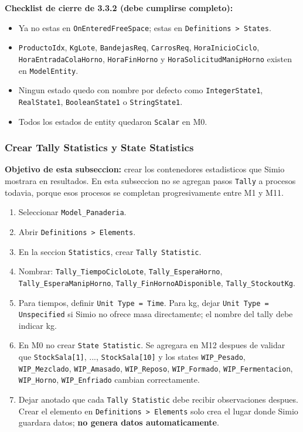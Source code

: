 \documentclass[11pt]{article}
\newcommand{\simio}[1]{\texttt{#1}}
\newcommand{\state}[1]{\texttt{#1}}
\begin{document}
\textbf{Checklist de cierre de 3.3.2 (debe cumplirse completo):}
\begin{itemize}
  \item [ ] Ya no estas en \simio{OnEnteredFreeSpace}; estas en \simio{Definitions > States}.
  \item [ ] \state{ProductoIdx}, \state{KgLote}, \state{BandejasReq}, \state{CarrosReq}, \state{HoraInicioCiclo}, \state{HoraEntradaColaHorno}, \state{HoraFinHorno} y \state{HoraSolicitudManipHorno} existen en \simio{ModelEntity}.
  \item [ ] Ningun estado quedo con nombre por defecto como \simio{IntegerState1}, \simio{RealState1}, \simio{BooleanState1} o \simio{StringState1}.
  \item [ ] Todos los estados de entity quedaron \simio{Scalar} en M0.
\end{itemize}

\subsubsection{Crear Tally Statistics y State Statistics}
\textbf{Objetivo de esta subseccion:} crear los contenedores estadisticos que Simio mostrara en resultados. En esta subseccion no se agregan pasos \simio{Tally} a procesos todavia, porque esos procesos se completan progresivamente entre M1 y M11.

\begin{enumerate}
  \item Seleccionar \simio{Model\_Panaderia}.
  \item Abrir \simio{Definitions > Elements}.
  \item En la seccion \simio{Statistics}, crear \simio{Tally Statistic}.
  \item Nombrar: \simio{Tally\_TiempoCicloLote}, \simio{Tally\_EsperaHorno}, \simio{Tally\_EsperaManipHorno}, \simio{Tally\_FinHornoADisponible}, \simio{Tally\_StockoutKg}.
  \item Para tiempos, definir \simio{Unit Type = Time}. Para kg, dejar \simio{Unit Type = Unspecified} si Simio no ofrece masa directamente; el nombre del tally debe indicar kg.
  \item En M0 no crear \simio{State Statistic}. Se agregara en M12 despues de validar que \state{StockSala[1]}, ..., \state{StockSala[10]} y los states \state{WIP\_Pesado}, \state{WIP\_Mezclado}, \state{WIP\_Amasado}, \state{WIP\_Reposo}, \state{WIP\_Formado}, \state{WIP\_Fermentacion}, \state{WIP\_Horno}, \state{WIP\_Enfriado} cambian correctamente.
  \item Dejar anotado que cada \simio{Tally Statistic} debe recibir observaciones despues. Crear el elemento en \simio{Definitions > Elements} solo crea el lugar donde Simio guardara datos; \textbf{no genera datos automaticamente}.
\end{enumerate}
\end{document}
